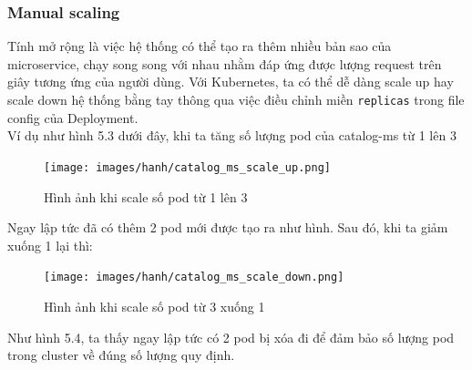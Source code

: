 \subsubsection{Manual scaling}
\noindent Tính mở rộng là việc hệ thống có thể tạo ra thêm nhiều bản sao của microservice, chạy song song với nhau nhằm đáp ứng được lượng request trên giây tương ứng của người dùng. Với Kubernetes, ta có thể dễ dàng scale up hay scale down hệ thống bằng tay thông qua việc điều chỉnh miền \lstinline|replicas| trong file config của Deployment.\\[0.5cm]
Ví dụ như hình 5.3 dưới đây, khi ta tăng số lượng pod của catalog-ms từ 1 lên 3
\begin{figure}[H]
  \begin{center}
    \texttt{[image: images/hanh/catalog\_ms\_scale\_up.png]}
    \caption{Hình ảnh khi scale số pod từ 1 lên 3}
  \end{center}
\end{figure}
Ngay lập tức đã có thêm 2 pod mới được tạo ra như hình. Sau đó, khi ta giảm xuống 1 lại thì:
\begin{figure}[H]
  \begin{center}
    \texttt{[image: images/hanh/catalog\_ms\_scale\_down.png]}
    \caption{Hình ảnh khi scale số pod từ 3 xuống 1}
  \end{center}
\end{figure}
Như hình 5.4, ta thấy ngay lập tức có 2 pod bị xóa đi để đảm bảo số lượng pod trong cluster về đúng số lượng quy định.

